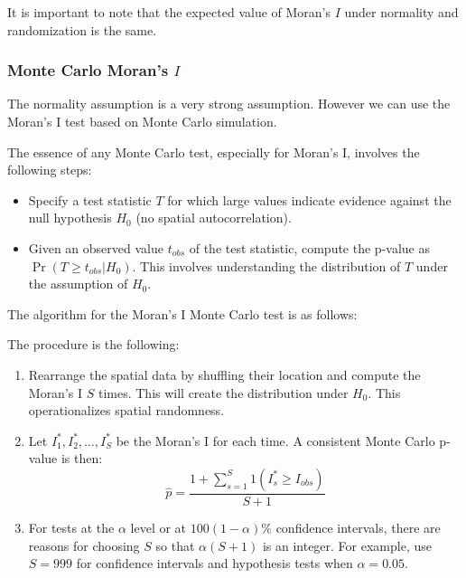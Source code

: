 \documentclass[english,12pt]{book}\usepackage[]{graphicx}\usepackage[]{xcolor}
\begin{document}
It is important to note that the expected value of Moran's $I$ under normality and randomization is the same. 

\subsubsection{Monte Carlo Moran's $I$}

The normality assumption is a very strong assumption. However we can use the Moran’s I test based on Monte Carlo simulation.

The essence of any Monte Carlo test, especially for Moran's I, involves the following steps: 

\begin{itemize}
  \item Specify a test statistic $T$ for which large values indicate evidence against the null hypothesis $H_0$ (no spatial autocorrelation).
  \item  Given an observed value $t_{obs}$ of the test statistic, compute the p-value as $\Pr(T\geq t_{obs}|H_0)$. This involves understanding the distribution of $T$ under the assumption of $H_0$.
\end{itemize}

The algorithm for the Moran's I Monte Carlo test is as follows:

\begin{algorithm}
The procedure is the following:
\begin{enumerate}
\item Rearrange the spatial data by shuffling their location and compute the Moran's I $S$ times. This will create the distribution under $H_0$. This operationalizes spatial randomness. 
\item Let $I_1^*, I_2^*,\ldots, I_S^*$ be the Moran's I for each time. A consistent Monte Carlo p-value is then:
  \begin{equation*}
    \widehat{p} = \frac{1 + \sum_{s=1}^S 1(I^*_s \geq I_{obs})}{S + 1}
  \end{equation*}
  \item For tests at the $\alpha$ level or at $100(1- \alpha)\%$ confidence intervals, there are reasons for choosing $S$ so that $\alpha(S + 1)$ is an integer. For example, use $S=999$ for confidence intervals and hypothesis tests when $\alpha = 0.05$.
\end{enumerate}
\end{algorithm}
\end{document}
